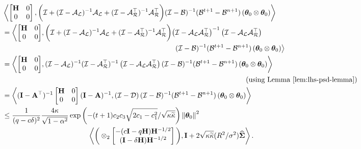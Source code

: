 	\begin{align}
		&\iprod{\begin{bmatrix}
			\Cov & \zero \\ \zero & \zero
			\end{bmatrix}}{\bigg( \eyeT + (\eyeT-\AL)^{-1}\AL + (\eyeT-\AR\T)^{-1}\AR\T\bigg) (\eyeT-\BT)^{-1}(\BT^{t+1}-\BT^{n+1}) \left(\thetat[0]\otimes \thetat[0]\right)} \nonumber \\ 
		&=\left\langle{\begin{bmatrix}
			\Cov & \zero \\ \zero & \zero
			\end{bmatrix}},\bigg( \eyeT + (\eyeT-\AL)^{-1}\AL + (\eyeT-\AR\T)^{-1}\AR\T\bigg) \inv{\left(\eyeT-\AL\AR\T\right)} \left(\eyeT-\AL\AR\T\right)\right. \nonumber \\ &\qquad \qquad \qquad \qquad \qquad \qquad \qquad \qquad \qquad \qquad \qquad \qquad \left.  (\eyeT-\BT)^{-1}(\BT^{t+1}-\BT^{n+1}) \left(\thetat[0]\otimes \thetat[0]\right)\right \rangle \nonumber \\ 
		&=\left\langle{\begin{bmatrix}
			\Cov & \zero \\ \zero & \zero
			\end{bmatrix}},(\eyeT-\AL)^{-1} (\eyeT-\AR\T)^{-1} \left(\eyeT-\AL\AR\T\right) (\eyeT-\BT)^{-1}(\BT^{t+1}-\BT^{n+1}) \left(\thetat[0]\otimes \thetat[0]\right)\right \rangle\nonumber \\ &\qquad \qquad \qquad \qquad \qquad \qquad \qquad \qquad \qquad \qquad \qquad \qquad \qquad\qquad\qquad\qquad\qquad \left(\mbox{using Lemma~\ref{lem:lhs-psd-lemma}}\right)\nonumber \\ 
		&= \iprod{(\eye-\A\T)^{-1} \begin{bmatrix}
			\Cov & \zero \\ \zero & \zero
			\end{bmatrix} (\eye-\A)^{-1} }{\left(\eyeT-\DT\right) (\eyeT-\BT)^{-1}(\BT^{t+1}-\BT^{n+1}) \left(\thetat[0]\otimes \thetat[0]\right)} \nonumber \\
		&\leq \frac{1}{(\g-c\delta)^2}\frac{4\cnH}{\sqrt{1-\alpha^2}} \exp\left(-(t+1) \ctwo \cthree \sqrt{2\cone - \cone^2}/\sqrt{\cnH\cnS}\right) \norm{\thetat[0]}^2\nonumber\\&\qquad\qquad\qquad\qquad\qquad\qquad \iprod{\bigg(\otimes_2\begin{bmatrix} -(c\eye-\g\Cov)\Cov^{-1/2}\\(\eye-\delta\Cov)\Cov^{-1/2}\end{bmatrix}\bigg)}{\eye + 2 \sqrt{\cnH\cnS} (\infbound/\sigma^2) \Sighat}.\nonumber
	\end{align}
